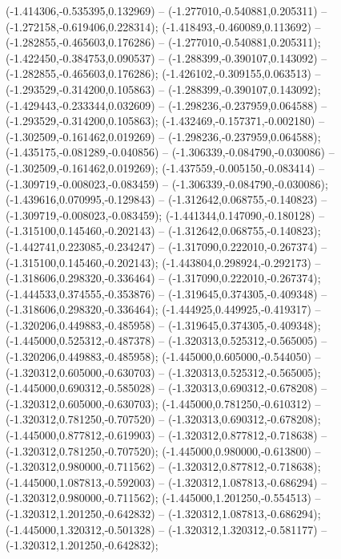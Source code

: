  (-1.414306,-0.535395,0.132969) -- (-1.277010,-0.540881,0.205311) -- (-1.272158,-0.619406,0.228314);
 (-1.418493,-0.460089,0.113692) -- (-1.282855,-0.465603,0.176286) -- (-1.277010,-0.540881,0.205311);
 (-1.422450,-0.384753,0.090537) -- (-1.288399,-0.390107,0.143092) -- (-1.282855,-0.465603,0.176286);
 (-1.426102,-0.309155,0.063513) -- (-1.293529,-0.314200,0.105863) -- (-1.288399,-0.390107,0.143092);
 (-1.429443,-0.233344,0.032609) -- (-1.298236,-0.237959,0.064588) -- (-1.293529,-0.314200,0.105863);
 (-1.432469,-0.157371,-0.002180) -- (-1.302509,-0.161462,0.019269) -- (-1.298236,-0.237959,0.064588);
 (-1.435175,-0.081289,-0.040856) -- (-1.306339,-0.084790,-0.030086) -- (-1.302509,-0.161462,0.019269);
 (-1.437559,-0.005150,-0.083414) -- (-1.309719,-0.008023,-0.083459) -- (-1.306339,-0.084790,-0.030086);
 (-1.439616,0.070995,-0.129843) -- (-1.312642,0.068755,-0.140823) -- (-1.309719,-0.008023,-0.083459);
 (-1.441344,0.147090,-0.180128) -- (-1.315100,0.145460,-0.202143) -- (-1.312642,0.068755,-0.140823);
 (-1.442741,0.223085,-0.234247) -- (-1.317090,0.222010,-0.267374) -- (-1.315100,0.145460,-0.202143);
 (-1.443804,0.298924,-0.292173) -- (-1.318606,0.298320,-0.336464) -- (-1.317090,0.222010,-0.267374);
 (-1.444533,0.374555,-0.353876) -- (-1.319645,0.374305,-0.409348) -- (-1.318606,0.298320,-0.336464);
 (-1.444925,0.449925,-0.419317) -- (-1.320206,0.449883,-0.485958) -- (-1.319645,0.374305,-0.409348);
 (-1.445000,0.525312,-0.487378) -- (-1.320313,0.525312,-0.565005) -- (-1.320206,0.449883,-0.485958);
 (-1.445000,0.605000,-0.544050) -- (-1.320312,0.605000,-0.630703) -- (-1.320313,0.525312,-0.565005);
 (-1.445000,0.690312,-0.585028) -- (-1.320313,0.690312,-0.678208) -- (-1.320312,0.605000,-0.630703);
 (-1.445000,0.781250,-0.610312) -- (-1.320312,0.781250,-0.707520) -- (-1.320313,0.690312,-0.678208);
 (-1.445000,0.877812,-0.619903) -- (-1.320312,0.877812,-0.718638) -- (-1.320312,0.781250,-0.707520);
 (-1.445000,0.980000,-0.613800) -- (-1.320312,0.980000,-0.711562) -- (-1.320312,0.877812,-0.718638);
 (-1.445000,1.087813,-0.592003) -- (-1.320312,1.087813,-0.686294) -- (-1.320312,0.980000,-0.711562);
 (-1.445000,1.201250,-0.554513) -- (-1.320312,1.201250,-0.642832) -- (-1.320312,1.087813,-0.686294);
 (-1.445000,1.320312,-0.501328) -- (-1.320312,1.320312,-0.581177) -- (-1.320312,1.201250,-0.642832);
